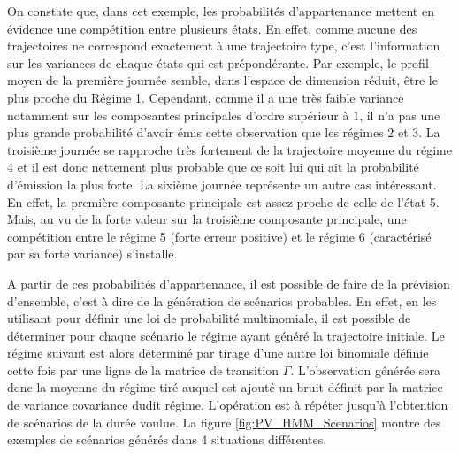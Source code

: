\documentclass[12pt, french]{report}
\begin{document}
On constate que, dans cet exemple, les probabilités d'appartenance mettent en évidence une compétition entre plusieurs états. En effet, comme aucune des trajectoires ne correspond exactement à une trajectoire type, c'est l'information sur les variances de chaque états qui est prépondérante. Par exemple, le profil moyen de la première journée semble, dans l'espace de dimension réduit, être le plus proche du Régime 1. Cependant, comme il a une très faible variance notamment sur les composantes principales d'ordre supérieur à 1, il n'a pas une plus grande probabilité d'avoir émis cette observation que les régimes 2 et 3. La troisième journée se rapproche très fortement de la trajectoire moyenne du régime 4 et il est donc nettement plus probable que ce soit lui qui ait la probabilité d'émission la plus forte. La sixième journée représente un autre cas intéressant. En effet, la première composante principale est assez proche de celle de l'état 5. Mais, au vu de la forte valeur sur la troisième composante principale, une compétition entre le régime 5 (forte erreur positive) et le régime 6 (caractérisé par sa forte variance) s'installe.

A partir de ces probabilités d'appartenance, il est possible de faire de la prévision d'ensemble, c'est à dire de la génération de scénarios probables. En effet, en les utilisant pour définir une loi de probabilité multinomiale, il est possible de déterminer pour chaque scénario le régime ayant généré la trajectoire initiale. Le régime suivant est alors déterminé par tirage d'une autre loi binomiale définie cette fois par une ligne de la matrice de transition $\Gamma$. L'observation générée sera donc la moyenne du régime tiré auquel est ajouté un bruit définit par la matrice de variance covariance dudit régime. L'opération est à répéter jusqu'à l'obtention de scénarios de la durée voulue. La figure \ref{fig:PV_HMM_Scenarios} montre des exemples de scénarios générés dans 4 situations différentes.
\end{document}
